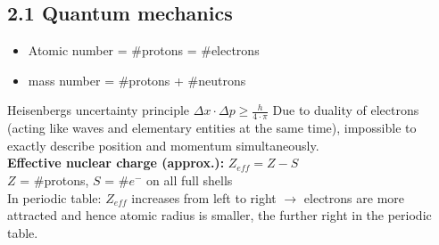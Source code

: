 \subsection{2.1 Quantum mechanics}
    \begin{itemize}
        \itemsep0em
            \item Atomic number = \#protons = \#electrons
            \item mass number = \#protons + \#neutrons
        \end{itemize}
        Heisenbergs uncertainty principle $\Delta x \cdot \Delta p \geq \frac{h}{4 \cdot \pi}$ Due to duality of electrons (acting like waves and elementary entities at the same time), impossible to exactly describe position and momentum simultaneously.\\
        \textbf{Effective nuclear charge (approx.):}   $Z_{eff} = Z-S$\\
        $Z$ = \#protons, $S$ = \#$e^-$ on all full shells
        \vspace{1mm}\\
        In periodic table: $Z_{eff}$ increases from left to right $\rightarrow$ electrons are more attracted and hence atomic radius is smaller, the further right in the periodic table. 